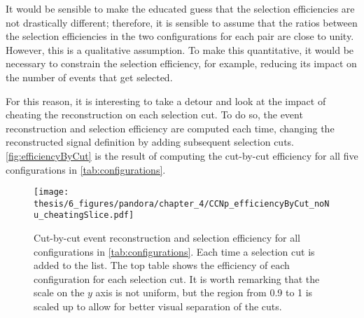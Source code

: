 It would be sensible to make the educated guess that the selection efficiencies are not drastically different; therefore, it is sensible to assume that the ratios between the selection efficiencies in the two configurations for each pair are close to unity. However, this is a qualitative assumption. To make this quantitative, it would be necessary to constrain the selection efficiency, for example, reducing its impact on the number of events that get selected. 

For this reason, it is interesting to take a detour and look at the impact of cheating the reconstruction on each selection cut. To do so, the event reconstruction and selection efficiency are computed each time, changing the reconstructed signal definition by adding subsequent selection cuts. \autoref{fig:efficiencyByCut} is the result of computing the cut-by-cut efficiency for all five configurations in \autoref{tab:configurations}. 

\begin{figure}
    \centering
    \texttt{[image: thesis/6\_figures/pandora/chapter\_4/CCNp\_efficiencyByCut\_noNu\_cheatingSlice.pdf]}
    \caption[Event reconstruction and selection efficiency with the cheated vertex creation]{Cut-by-cut event reconstruction and selection efficiency for all configurations in \autoref{tab:configurations}. Each time a selection cut is added to the list. The top table shows the efficiency of each configuration for each selection cut. It is worth remarking that the scale on the $y$ axis is not uniform, but the region from 0.9 to 1 is scaled up to allow for better visual separation of the cuts. }
    \label{fig:efficiencyByCut}
\end{figure}

